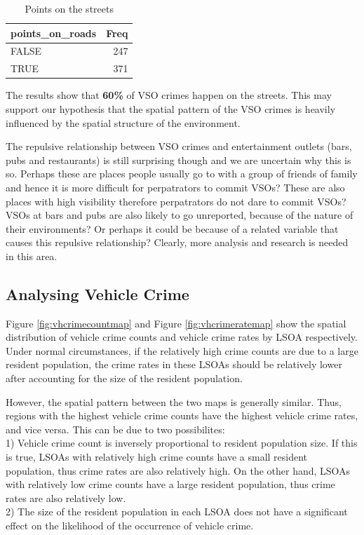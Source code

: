 \documentclass[]{article}
\theoremstyle{definition}
\theoremstyle{definition}
\theoremstyle{definition}
\theoremstyle{remark}
\begin{document}
\begin{table}

\caption{\label{tab:COL001F-roads-intersect}Points on the streets}
\centering
\begin{tabular}[t]{l|r}
\hline
points\_on\_roads & Freq\\
\hline
FALSE & 247\\
\hline
TRUE & 371\\
\hline
\end{tabular}
\end{table}

The results show that \textbf{60\%} of VSO crimes happen on the streets.
This may support our hypothesis that the spatial pattern of the VSO
crimes is heavily influenced by the spatial structure of the
environment.

The repulsive relationship between VSO crimes and entertainment outlets
(bars, pubs and restaurants) is still surprising though and we are
uncertain why this is so. Perhaps these are places people usually go to
with a group of friends of family and hence it is more difficult for
perpatrators to commit VSOs? These are also places with high visibility
therefore perpatrators do not dare to commit VSOs? VSOs at bars and pubs
are also likely to go unreported, because of the nature of their
environments? Or perhaps it could be because of a related variable that
causes this repulsive relationship? Clearly, more analysis and research
is needed in this area.

\hypertarget{htmlwidget-0c1675809333a60c367a}{}

\subsection{Analysing Vehicle Crime}\label{analysing-vehicle-crime}

Figure \ref{fig:vhcrimecountmap} and Figure \ref{fig:vhcrimeratemap}
show the spatial distribution of vehicle crime counts and vehicle crime
rates by LSOA respectively. Under normal circumstances, if the
relatively high crime counts are due to a large resident population, the
crime rates in these LSOAs should be relatively lower after accounting
for the size of the resident population.

However, the spatial pattern between the two maps is generally similar.
Thus, regions with the highest vehicle crime counts have the highest
vehicle crime rates, and vice versa. This can be due to two
possibilites:\\
1) Vehicle crime count is inversely proportional to resident population
size. If this is true, LSOAs with relatively high crime counts have a
small resident population, thus crime rates are also relatively high. On
the other hand, LSOAs with relatively low crime counts have a large
resident population, thus crime rates are also relatively low.\\
2) The size of the resident population in each LSOA does not have a
significant effect on the likelihood of the occurrence of vehicle crime.
\end{document}
